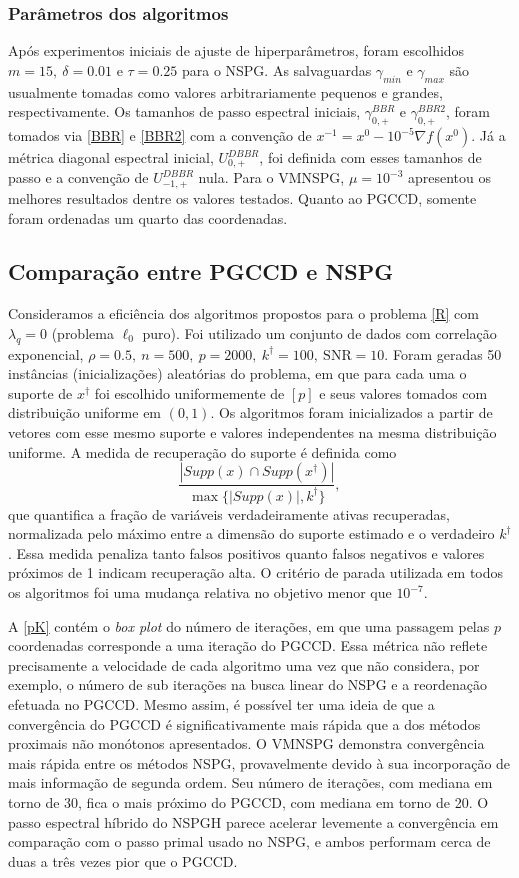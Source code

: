 \subsubsection{Parâmetros dos algoritmos}
Após experimentos iniciais de ajuste de hiperparâmetros, foram escolhidos $m=15,\ \delta=0.01$ e $\tau=0.25$ para o NSPG. As salvaguardas $\gamma_{min}$ e $\gamma_{max}$ são usualmente tomadas como valores arbitrariamente pequenos e grandes, respectivamente. Os tamanhos de passo espectral iniciais, $\gamma^{BBR}_{0,+}$ e $\gamma^{BBR2}_{0,+}$, foram tomados via \eqref{BBR} e \eqref{BBR2} com a convenção de $x^{-1}=x^0-10^{-5}\nabla f(x^0)$. Já a métrica diagonal espectral inicial, $U_{0,+}^{DBBR}$, foi definida com esses tamanhos de passo e a convenção de $U_{-1,+}^{DBBR}$ nula. Para o VMNSPG, $\mu=10^{-3}$ apresentou os melhores resultados dentre os valores testados. Quanto ao PGCCD, somente foram ordenadas um quarto das coordenadas.



\subsection{Comparação entre PGCCD e NSPG}
Consideramos a eficiência dos algoritmos propostos para o problema \eqref{R} com $\lambda_q=0$ (problema $\ell_0$ puro). Foi utilizado um conjunto de dados com correlação exponencial, $\rho=0.5,\ n=500,\ p=2000,\ k^\dagger=100,\ \text{SNR}=10$. Foram geradas 50 instâncias (inicializações) aleatórias do problema, em que para cada uma o suporte de $x^\dagger$ foi escolhido uniformemente de $[p]$ e seus valores tomados com distribuição uniforme em $(0,1)$. Os algoritmos foram inicializados a partir de vetores com esse mesmo suporte e valores independentes na mesma distribuição uniforme. A medida de recuperação do suporte é definida como 
\[\frac{| Supp(x) \cap Supp(x^\dagger) |}{\max \{ |Supp(x)|, k^\dagger \}},\]
que quantifica a fração de variáveis verdadeiramente ativas recuperadas, normalizada pelo máximo entre a dimensão do suporte estimado e o verdadeiro $k^\dagger$. Essa medida penaliza tanto falsos positivos quanto falsos negativos e valores próximos de 1 indicam recuperação alta. O critério de parada utilizada em todos os algoritmos foi uma mudança relativa no objetivo menor que $10^{-7}$.

A \autoref{pK} contém o \textit{box plot} do número de iterações, em que uma passagem pelas $p$ coordenadas corresponde a uma iteração do PGCCD. Essa métrica não reflete precisamente a velocidade de cada algoritmo uma vez que não considera, por exemplo, o número de sub iterações na busca linear do NSPG e a reordenação efetuada no PGCCD. Mesmo assim, é possível ter uma ideia de que a convergência do PGCCD é significativamente mais rápida que a dos métodos proximais não monótonos apresentados. O VMNSPG demonstra convergência mais rápida entre os métodos NSPG, provavelmente devido à sua incorporação de mais informação de segunda ordem. Seu número de iterações, com mediana em torno de 30, fica o mais próximo do PGCCD, com mediana em torno de 20. O passo espectral híbrido do NSPGH parece acelerar levemente a convergência em comparação com o passo primal usado no NSPG, e ambos performam cerca de duas a três vezes pior que o PGCCD.

